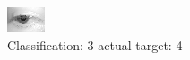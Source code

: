 \begin{figure}[h!]
\begin{center}
\includegraphics[width=0.60\columnwidth]{figures/ID2635_class_3_target_4.png}
\end{center}
\caption{ Classification: 3 actual target: 4}
\label{fig:ID2635_class_3_target_4}
\end{figure}
